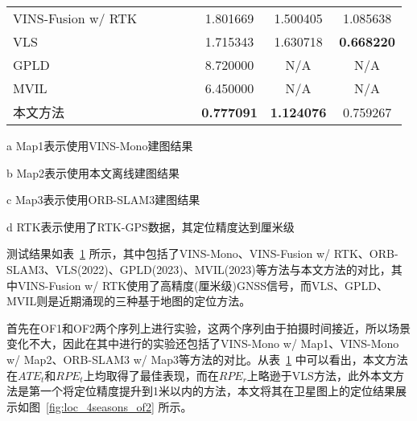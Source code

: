 \begin{table}
\begin{threeparttable}[c]
\begin{tabular}{lccccccc}
VINS-Fusion w/  RTK &                                                                            &                      &                      &                      & 1.801669          & 1.500405          & 1.085638          \\
VLS                                    &                                                                            &                      &                      &                      & 1.715343          & 1.630718          & \cellcolor[HTML]{FFCCC9}\textbf{0.668220} \\
GPLD                                   &                                                                            &                      &                      &                      & 8.720000          & N/A               & N/A               \\
MVIL                                   &                                                                            &                      &                      &                      & 6.450000          & N/A               & N/A               \\
本文方法                                   &                                                                            &                      &                      &                      & \cellcolor[HTML]{FFCCC9}\textbf{0.777091} & \cellcolor[HTML]{FFCCC9}\textbf{1.124076} & 0.759267          \\ \bottomrule
\end{tabular}
\label{tab:loc_4seasons_of2}
\begin{tablenotes}
  \item [a] Map1表示使用VINS-Mono建图结果
  \item [b] Map2表示使用本文离线建图结果
  \item [c] Map3表示使用ORB-SLAM3建图结果
  \item [d] RTK表示使用了RTK-GPS数据，其定位精度达到厘米级
\end{tablenotes}
\end{threeparttable}
\end{table}

测试结果如表~\ref{tab:loc_4seasons_of2} 所示，其中包括了VINS-Mono、VINS-Fusion w/ RTK、ORB-SLAM3、VLS\cite{yang2022real}(2022)、GPLD\cite{hao2023global}(2023)、MVIL\cite{zhang2023map}(2023)等方法与本文方法的对比，其中VINS-Fusion w/ RTK使用了高精度(厘米级)GNSS信号，而VLS、GPLD、MVIL则是近期涌现的三种基于地图的定位方法。

首先在OF1和OF2两个序列上进行实验，这两个序列由于拍摄时间接近，所以场景变化不大，因此在其中进行的实验还包括了VINS-Mono w/ Map1、VINS-Mono w/ Map2、ORB-SLAM3 w/ Map3等方法的对比。从表~\ref{tab:loc_4seasons_of2} 中可以看出，本文方法在$ATE_t$和$RPE_t$上均取得了最佳表现，而在$RPE_r$上略逊于VLS方法，此外本文方法是第一个将定位精度提升到1米以内的方法，本文将其在卫星图上的定位结果展示如图~\ref{fig:loc_4seasons_of2} 所示。

